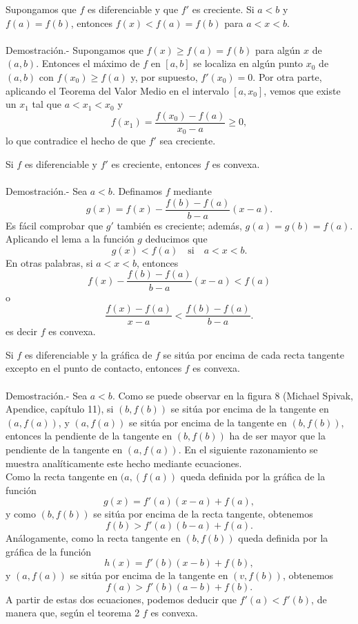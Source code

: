\begin{lema}
    Supongamos que $f$ es diferenciable y que $f'$ es creciente. Si $a<b$ y $f(a)=f(b)$, entonces $f(x)<f(a)=f(b)$ para $a<x<b$.\\\\
	Demostración.-\; Supongamos que $f(x)\geq f(a)=f(b)$ para algún $x$ de $(a,b)$. Entonces el máximo de $f$ en $[a,b]$ se localiza en algún punto $x_0$ de $(a,b)$ con $f(x_0)\geq f(a)$ y, por supuesto, $f'(x_0)=0$. Por otra parte, aplicando el Teorema del Valor Medio en el intervalo $[a,x_0]$, vemos que existe un $x_1$ tal que $a<x_1<x_0$ y 
	$$f(x_1)=\dfrac{f(x_0)-f(a)}{x_0-a}\geq 0,$$
	lo que contradice el hecho de que $f'$ sea creciente.
\end{lema}

\begin{teo}
    Si $f$ es diferenciable y $f'$ es creciente, entonces $f$ es convexa.\\\\
	Demostración.-\; Sea $a<b$. Definamos $f$ mediante
	$$g(x)=f(x)-\dfrac{f(b)-f(a)}{b-a}(x-a).$$
	Es fácil comprobar que $g'$ también es creciente; además, $g(a)=g(b)=f(a)$. Aplicando el lema a la función $g$ deducimos que
	$$g(x)<f(a)\quad \mbox{si}\quad a<x<b.$$
	En otras palabras, si $a<x<b$, entonces
	$$f(x)-\dfrac{f(b)-f(a)}{b-a}(x-a)<f(a)$$
	o
	$$\dfrac{f(x)-f(a)}{x-a}<\dfrac{f(b)-f(a)}{b-a}.$$
	es decir $f$ es convexa.
\end{teo}

\begin{teo}
    Si $f$ es diferenciable y la gráfica de $f$ se sitúa por encima de cada recta tangente excepto en el punto de contacto, entonces $f$ es convexa.\\\\
	Demostración.-\; Sea $a<b$. Como se puede observar en la figura 8 (Michael Spivak, Apendice, capítulo 11), si $(b,f(b))$ se sitúa por encima de la tangente en $(a,f(a))$, y $(a,f(a))$ se sitúa por encima de la tangente en $(b,f(b))$, entonces la pendiente de la tangente en $(b,f(b))$ ha de ser mayor que la pendiente de la tangente en $(a,f(a))$. En el siguiente razonamiento se muestra analíticamente este hecho mediante ecuaciones.\\
	Como la recta tangente en $(a,(f(a))$ queda definida por la gráfica de la función
	$$g(x)=f'(a)(x-a)+f(a),$$
	y como $(b,f(b))$ se sitúa por encima de la recta tangente, obtenemos
	$$f(b)>f'(a)(b-a)+f(a).$$
	Análogamente, como la recta tangente en $(b,f(b))$ queda definida por la gráfica de la función
	$$h(x)=f'(b)(x-b)+f(b),$$
	y $(a,f(a))$ se sitúa por encima de la tangente en $(v,f(b))$, obtenemos
	$$f(a)>f'(b)(a-b)+f(b).$$
	A partir de estas dos ecuaciones, podemos deducir que $f'(a)<f'(b)$, de manera que, según el teorema 2 $f$ es convexa.
\end{teo}

